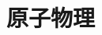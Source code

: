 \documentclass[../../all/physics-standard_answers_all.tex]{subfiles}
\begin{document}
\section{原子物理}
\end{document}
